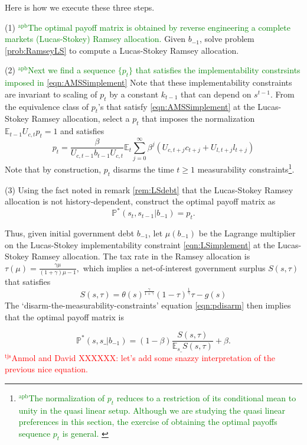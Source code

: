 \documentclass[12pt]{article}
\newcommand{\apb}[1]{\textcolor{green}{$^{\textrm{apb}}${#1}}}
\newcommand{\tjs}[1]{\textcolor{red}{$^{\textrm{tjs}}${#1}}}
\newcommand{\EE}{\mathbb E}
\begin{document}
Here is how we execute these three steps.

\noindent (1) \apb{The optimal payoff matrix is obtained by reverse engineering a complete markets (Lucas-Stokey)  Ramsey allocation.} Given $b_{-1}$, solve problem \ref{prob:RamseyLS} to compute a  Lucas-Stokey Ramsey allocation.


(2) \apb{Next we find a sequence $\{p_t\}$ that satisfies the implementability constrsints imposed in \eqref{eqn:AMSSimplement}} Note that these implementability constraints are invariant to scaling of $p_t$ by a constant $k_{t-1} $ that can depend on $s^{t-1}$. From the equivalence class of $p_t$'s that satisfy \eqref{eqn:AMSSimplement} at the Lucas-Stokey Ramsey allocation, select a  $p_t$ that imposes the normalization  $\mathbb{E}_{t-1}U_{c,t}p_t=1$ and satisfies
\begin{equation}\label{eqn:pdisarm} p_t =  \frac{\beta}{U_{c,t-1} b_{t-1} U_{c,t}}\EE_t\sum_{j=0}^\infty\beta^j\left( U_{c,t+j}c_{t+j}+U_{l,t+j}l_{t+j}\right) \end{equation}
Note that by construction, $p_t$   disarms the time  $t\geq 1$
measurability constraints\footnote{\apb{The normalization of $p_t$ reduces to a restriction of its conditional mean to unity in the quasi linear setup. Although we are studying the quasi linear preferences in this section, the exercise of obtaining the optimal payoffs sequence $p_t$ is general. }}. 


(3) Using the fact noted in remark \ref{rem:LSdebt} that the Lucas-Stokey Ramsey allocation is not history-dependent,  construct the optimal payoff matrix as
\[\mathbb{P}^*(s_t,s_{t-1}|b_{-1})=p_t.\]

Thus,  given
 initial government debt $b_{-1}$,  let $\mu(b_{-1})$ be the Lagrange multiplier on the Lucas-Stokey implementability constraint \eqref{eqn:LSimplement}
 at the Lucas-Stokey Ramsey allocation.  The tax rate in the Ramsey allocation is
$
		\tau(\mu) = \frac{\gamma\mu}{(1+\gamma)\mu-1},
	$
 which implies a  net-of-interest government surplus $S(s,\tau)$ that satisfies
\[		S(s,\tau) = \theta(s)^\frac\gamma{1+\gamma}(1-\tau)^\frac1\gamma\tau-g(s)
	\]
The `disarm-the-measurability-constraints' equation \eqref{eqn:pdisarm} then implies that the optimal payoff matrix is

\begin{equation}\label{eqn:optPP}
 \mathbb{P}^*(s, s\_ |b_{-1}) = (1-\beta)\frac{S(s,\tau)}{\EE_{s\_} S(s,\tau)} + \beta.
 \end{equation}
\tjs{Anmol and David XXXXXX: let's add some snazzy interpretation of the previous nice equation.}
\end{document}
